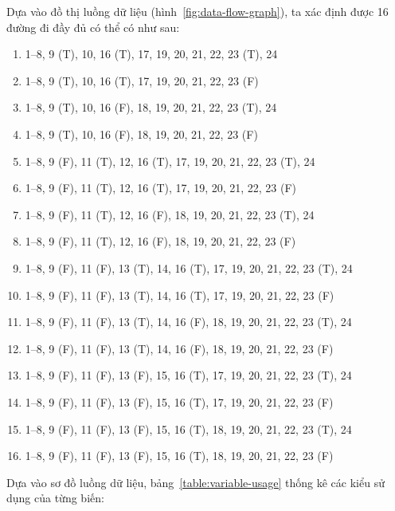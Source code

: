 \documentclass{article}
\begin{document}
\bigskip
\par Dựa vào đồ thị luồng dữ liệu (hình~\ref{fig:data-flow-graph}), ta xác định được 16 đường đi đầy đủ có thể có như sau:
\bigskip

\begin{enumerate}[label = (\arabic*),itemindent=1cm]
    \item 1--8, 9 (T), 10, 16 (T), 17, 19, 20, 21, 22, 23 (T), 24
    \item 1--8, 9 (T), 10, 16 (T), 17, 19, 20, 21, 22, 23 (F)
    \item 1--8, 9 (T), 10, 16 (F), 18, 19, 20, 21, 22, 23 (T), 24
    \item 1--8, 9 (T), 10, 16 (F), 18, 19, 20, 21, 22, 23 (F)
    \item 1--8, 9 (F), 11 (T), 12, 16 (T), 17, 19, 20, 21, 22, 23 (T), 24
    \item 1--8, 9 (F), 11 (T), 12, 16 (T), 17, 19, 20, 21, 22, 23 (F)
    \item 1--8, 9 (F), 11 (T), 12, 16 (F), 18, 19, 20, 21, 22, 23 (T), 24
    \item 1--8, 9 (F), 11 (T), 12, 16 (F), 18, 19, 20, 21, 22, 23 (F)
    \item 1--8, 9 (F), 11 (F), 13 (T), 14, 16 (T), 17, 19, 20, 21, 22, 23 (T), 24
    \item 1--8, 9 (F), 11 (F), 13 (T), 14, 16 (T), 17, 19, 20, 21, 22, 23 (F)
    \item 1--8, 9 (F), 11 (F), 13 (T), 14, 16 (F), 18, 19, 20, 21, 22, 23 (T), 24
    \item 1--8, 9 (F), 11 (F), 13 (T), 14, 16 (F), 18, 19, 20, 21, 22, 23 (F)
    \item 1--8, 9 (F), 11 (F), 13 (F), 15, 16 (T), 17, 19, 20, 21, 22, 23 (T), 24
    \item 1--8, 9 (F), 11 (F), 13 (F), 15, 16 (T), 17, 19, 20, 21, 22, 23 (F)
    \item 1--8, 9 (F), 11 (F), 13 (F), 15, 16 (T), 18, 19, 20, 21, 22, 23 (T), 24
    \item 1--8, 9 (F), 11 (F), 13 (F), 15, 16 (T), 18, 19, 20, 21, 22, 23 (F)
\end{enumerate}

\bigskip
\bigskip
\bigskip
\par Dựa vào sơ đồ luồng dữ liệu, bảng~\ref{table:variable-usage} thống kê các kiểu sử dụng của từng biến:
\bigskip
\bigskip
\bigskip
\end{document}
